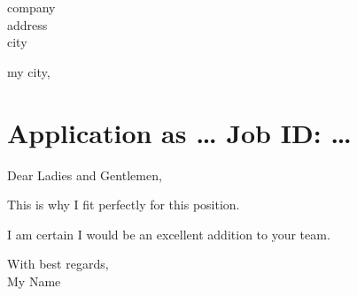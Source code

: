\documentclass[12pt,a4paper]{article}
\begin{document}
\begin{minipage}[b]{6cm}
    company \\
    address \\
    city
\end{minipage}
\hfill
\begin{minipage}[b]{4cm}
    {\flushright my city, \isodate\\}
\end{minipage}


\section*{Application as \dots
    \hfill \small{Job ID: \dots}
}

Dear Ladies and Gentlemen,
\bigskip

This is why I fit perfectly for this position.
\bigskip

I am certain I would be an excellent addition to your team.
\bigskip

With best regards,\\
My Name
\end{document}
